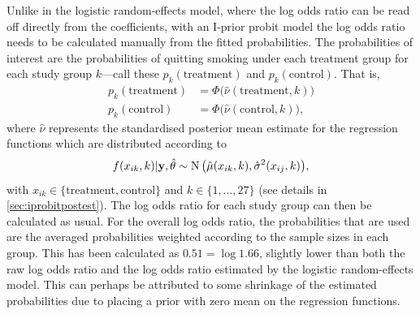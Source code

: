 \documentclass[a4paper,showframe,11pt]{report}\usepackage[]{graphicx}\usepackage[]{color}
\begin{document}
Unlike in the logistic random-effects model, where the log odds ratio can be read off directly from the coefficients, with an I-prior probit model the log odds ratio needs to be calculated manually from the fitted probabilities.
The probabilities of interest are the probabilities of quitting smoking under each treatment group for each study group $k$---call these $p_k(\text{treatment})$ and $p_k(\text{control})$.
That is,
\begin{align*}
  p_k(\text{treatment}) &= \Phi\big( \hat\nu(\text{treatment}, k) \big) \\
  p_k(\text{control})   &= \Phi\big( \hat\nu(\text{control}, k) \big),
\end{align*}
where $\hat \nu$ represents the standardised posterior mean estimate for the regression functions which are distributed according to
\[
  f(x_{ik},k)|{\mathbf y},\hat\theta \sim \operatorname{N}\big(\hat\mu(x_{ik}, k), \hat\sigma^2(x_{ij}, k) \big),
\]
with $x_{ik}\in\{\text{treatment}, \text{control} \}$ and $k \in \{1,\dots,27\}$  (see details in \cref{sec:iprobitpostest}).
The log odds ratio for each study group can then be calculated as usual.
For the overall log odds ratio, the probabilities that are used are the averaged probabilities weighted according to the sample sizes in each group.
This has been calculated as $0.51 = \log 1.66$, slightly lower than both the raw log odds ratio and the log odds ratio estimated by the logistic random-effects model.
This can perhaps be attributed to some shrinkage of the estimated probabilities due to placing a prior with zero mean on the regression functions.
\end{document}
